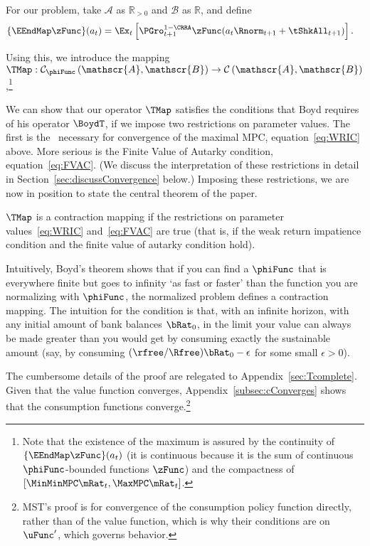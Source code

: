 \documentclass[BufferStockTheory]{subfiles}
\begin{document}
For our problem, take $\mathscr{A}$ as $\mathbb{R}_{>0}$ and $\mathscr{B}$
as $\mathbb{R}$, and define
\begin{align*}
  \{\EEndMap \zFunc\}(a_{t})  & = \Ex_{t}\left[\PGro^{1-\CRRA}_{t+1} \zFunc(a_{t} \Rnorm_{t+1} + \tShkAll_{t+1})\right].
\end{align*}

Using this, we introduce the mapping \textit{$\TMap:\mathcal{C}_{\phiFunc }\left( \mathscr{A},\mathscr{B}\right) \rightarrow \mathcal{C}\left( \mathscr{A},\mathscr{B}\right) $},\footnote{Note that the existence of the maximum is assured by the continuity of $\{\EEndMap \zFunc\}(a_{t})$ (it is continuous because it is the sum of continuous $\phiFunc$-bounded functions $\zFunc$) and the compactness of $[\MinMinMPC \mRat_{t}, \MaxMPC \mRat_{t}]$.}

\hypertarget{Contraction-Conditions}{}

We can show that our operator $\TMap$ satisfies the conditions that Boyd requires of his operator $\BoydT$, if we impose two restrictions on parameter values.  The first is the \WRIC~necessary for convergence of the maximal MPC, equation~\eqref{eq:WRIC} above.  More serious is the Finite Value of Autarky condition, equation~\eqref{eq:FVAC}.  (We discuss the interpretation of these restrictions in detail in Section~\ref{sec:discussConvergence} below.)  Imposing these restrictions, we are now in position to state the central theorem of the paper.

\hypertarget{MainTheorem}{}
\setcounter{theorem}{0}
\begin{theorem}\label{thm:contmap}
  $\TMap$ is a contraction mapping if the restrictions on parameter values~\eqref{eq:WRIC} and~\eqref{eq:FVAC} are true (that is, if the weak return impatience condition and the finite value of autarky condition hold).
\end{theorem}

Intuitively, Boyd's theorem shows that if you can find a $\phiFunc$ that is everywhere finite but goes to infinity `as fast or faster' than the function you are normalizing with $\phiFunc$, the normalized problem defines a contraction mapping.  The intuition for the {\FVAC} condition is that, with an infinite horizon, with any initial amount of bank balances $\bRat_{0}$, in the limit your value can always be made greater than you would get by consuming exactly the sustainable amount (say, by consuming $(\rfree/\Rfree)\bRat_{0}-\epsilon$ for some small $\epsilon>0$).

The cumbersome details of the proof are relegated to Appendix~\ref{sec:Tcomplete}.  Given that the value function converges, Appendix~\ref{subsec:cConverges} shows that the consumption functions converge.\footnote{MST's proof is for convergence of the consumption policy function directly, rather than of the value function, which is why their conditions are on $\uFunc^{\prime}$, which governs behavior.}
\end{document}

